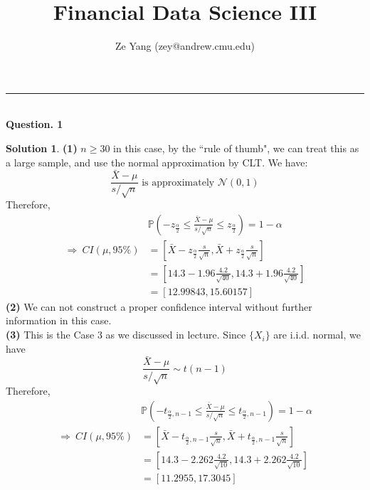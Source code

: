 \documentclass[a4paper, 10pt]{article}
\title{\textbf{Financial Data Science III}}
\author{Ze Yang (zey@andrew.cmu.edu)}
\theoremstyle{definition}
\theoremstyle{hSol}
\newtheorem*{solution}{Solution}
\begin{document}
\maketitle


\noindent\rule{16cm}{0.4pt}
~\\
\textbf{Question. 1}
\begin{solution} 
\textbf{(1)} $n\geq 30$ in this case, by the ``rule of thumb", we can treat this as a large sample, and use the normal approximation by CLT. We have:
\begin{equation}
  \frac{\bar{X}-\mu}{s/\sqrt{n}} \text{ is approximately } \mathcal{N}(0,1)
\end{equation}
Therefore,
\begin{equation}
  \begin{split}
    &\mathbb{P}\left(-z_{\frac{\alpha}{2}} \leq \frac{\bar{X}-\mu}{s/\sqrt{n}}\leq z_{\frac{\alpha}{2}}\right) = 1- \alpha\\
    \Rightarrow ~CI(\mu, 95\%) &= \left[\bar{X}-z_{\frac{\alpha}{2}}\frac{s}{\sqrt{n}}, \bar{X}+z_{\frac{\alpha}{2}}\frac{s}{\sqrt{n}}\right] \\
    & =  \left[14.3 - 1.96 \frac{4.2}{\sqrt{40}} , 14.3 + 1.96 \frac{4.2}{\sqrt{40}}\right] \\
    & = \left[12.99843, 15.60157\right]
  \end{split}
\end{equation}
\textbf{(2)} We can not construct a proper confidence interval without further information in this case.
~\\
\textbf{(3)} This is the Case 3 as we discussed in lecture. Since $\{X_i\}$ are i.i.d. normal, we have
\begin{equation}
  \frac{\bar{X}-\mu}{s/\sqrt{n}} \sim t(n-1)
\end{equation}
Therefore,
\begin{equation}
  \begin{split}
    &\mathbb{P}\left(-t_{\frac{\alpha}{2}, n-1} \leq \frac{\bar{X}-\mu}{s/\sqrt{n}}\leq t_{\frac{\alpha}{2}, n-1}\right) = 1- \alpha\\
    \Rightarrow ~CI(\mu, 95\%) &= \left[\bar{X}-t_{\frac{\alpha}{2}, n-1}\frac{s}{\sqrt{n}}, \bar{X}+t_{\frac{\alpha}{2}, n-1}\frac{s}{\sqrt{n}}\right] \\
    & =  \left[14.3 - 2.262 \frac{4.2}{\sqrt{10}} , 14.3 + 2.262 \frac{4.2}{\sqrt{10}}\right] \\
    & =  \left[11.2955, 17.3045\right]
  \end{split}
\end{equation}
\end{solution}
\end{document}
